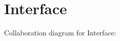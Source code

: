 \hypertarget{group__IRCInterface}{}\section{Interface}
\label{group__IRCInterface}
Collaboration diagram for Interface\+:
